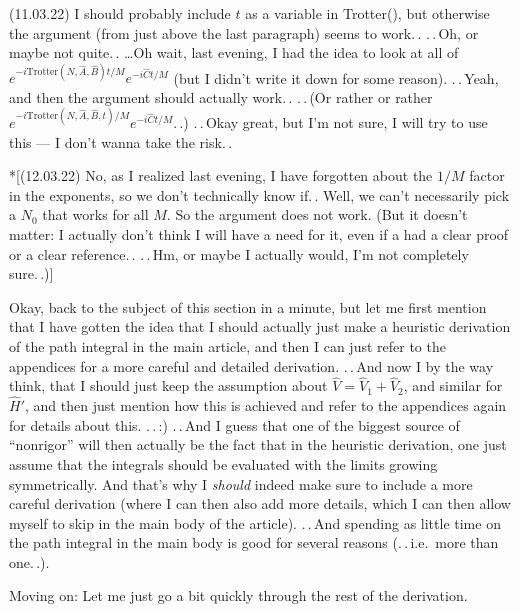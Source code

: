 \documentclass{report}
\begin{document}
(11.03.22) I should probably include $t$ as a variable in Trotter(), but otherwise the argument (from just above the last paragraph) seems to work.\,. .\,.\,Oh, or maybe not quite.\,. \ldots Oh wait, last evening, I had the idea to look at all of $e^{-i \mathrm{Trotter}(N, \hat A, \hat B) t / M} e^{-i \hat C t / M}$ (but I didn't write it down for some reason). .\,.\,Yeah, and then the argument should actually work.\,. .\,.\,(Or rather or rather $e^{-i \mathrm{Trotter}(N, \hat A, \hat B, t) / M} e^{-i \hat C t / M}$.\,.) .\,.\,Okay great, but I'm not sure, I will try to use this --- I don't wanna take the risk.\,. 

*[(12.03.22) No, as I realized last evening, I have forgotten about the $1/M$ factor in the exponents, so we don't technically know if.\,. Well, we can't necessarily pick a $N_0$ that works for all $M$. So the argument does not work. (But it doesn't matter: I actually don't think I will have a need for it, even if a had a clear proof or a clear reference.\,. .\,.\,Hm, or maybe I actually would, I'm not completely sure.\,.)]

Okay, back to the subject of this section in a minute, but let me first mention that I have gotten the idea that I should actually just make a heuristic derivation of the path integral in the main article, and then I can just refer to the appendices for a more careful and detailed derivation. .\,.\,And now I by the way think, that I should just keep the assumption about $\hat V = \hat V_1 + \hat V_2$, and similar for $\hat H'$, and then just mention how this is achieved and refer to the appendices again for details about this. .\,.\,:) .\,.\,And I guess that one of the biggest source of ``nonrigor'' will then actually be the fact that in the heuristic derivation, one just assume that the integrals should be evaluated with the limits growing symmetrically. And that's why I \emph{should} indeed make sure to include a more careful derivation (where I can then also add more details, which I can then allow myself to skip in the main body of the article). .\,.\,And spending as little time on the path integral in the main body is good for several reasons (.\,.\,i.e.\ more than one.\,.). 

Moving on: Let me just go a bit quickly through the rest of the derivation.
\end{document}
